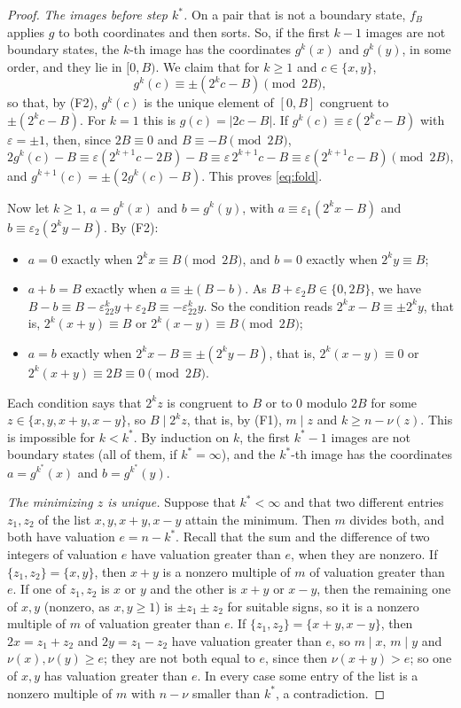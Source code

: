 \documentclass[11pt]{amsart}
\theoremstyle{definition}
\theoremstyle{remark}
\newcommand{\vt}{\nu}
\begin{document}
\begin{proof}
\emph{The images before step $k^*$.} On a pair that is not a boundary state, $f_B$ applies $g$ to both coordinates and then sorts. So, if the first $k-1$ images are not boundary states, the $k$-th image has the coordinates $g^k(x)$ and $g^k(y)$, in some order, and they lie in $[0,B)$. We claim that for $k\ge1$ and $c\in\{x,y\}$,
\begin{equation}\label{eq:fold}
g^k(c)\equiv\pm(2^kc-B)\pmod{2B},
\end{equation}
so that, by (F2), $g^k(c)$ is the unique element of $[0,B]$ congruent to $\pm(2^kc-B)$. For $k=1$ this is $g(c)=|2c-B|$. If $g^k(c)\equiv\varepsilon(2^kc-B)$ with $\varepsilon=\pm1$, then, since $2B\equiv0$ and $B\equiv-B\pmod{2B}$,
\[
2g^k(c)-B\equiv\varepsilon(2^{k+1}c-2B)-B\equiv\varepsilon\,2^{k+1}c-B\equiv\varepsilon(2^{k+1}c-B)\pmod{2B},
\]
and $g^{k+1}(c)=\pm(2g^k(c)-B)$. This proves \eqref{eq:fold}.

Now let $k\ge1$, $a=g^k(x)$ and $b=g^k(y)$, with $a\equiv\varepsilon_1(2^kx-B)$ and $b\equiv\varepsilon_2(2^ky-B)$. By (F2):
\begin{itemize}
\item $a=0$ exactly when $2^kx\equiv B\pmod{2B}$, and $b=0$ exactly when $2^ky\equiv B$;
\item $a+b=B$ exactly when $a\equiv\pm(B-b)$. As $B+\varepsilon_2B\in\{0,2B\}$, we have $B-b\equiv B-\varepsilon_22^ky+\varepsilon_2B\equiv-\varepsilon_22^ky$. So the condition reads $2^kx-B\equiv\pm2^ky$, that is, $2^k(x+y)\equiv B$ or $2^k(x-y)\equiv B\pmod{2B}$;
\item $a=b$ exactly when $2^kx-B\equiv\pm(2^ky-B)$, that is, $2^k(x-y)\equiv0$ or $2^k(x+y)\equiv2B\equiv0\pmod{2B}$.
\end{itemize}
Each condition says that $2^kz$ is congruent to $B$ or to $0$ modulo $2B$ for some $z\in\{x,y,x+y,x-y\}$, so $B\mid2^kz$, that is, by (F1), $m\mid z$ and $k\ge n-\vt(z)$. This is impossible for $k<k^*$. By induction on $k$, the first $k^*-1$ images are not boundary states (all of them, if $k^*=\infty$), and the $k^*$-th image has the coordinates $a=g^{k^*}(x)$ and $b=g^{k^*}(y)$.

\emph{The minimizing $z$ is unique.} Suppose that $k^*<\infty$ and that two different entries $z_1,z_2$ of the list $x,y,x+y,x-y$ attain the minimum. Then $m$ divides both, and both have valuation $e=n-k^*$. Recall that the sum and the difference of two integers of valuation $e$ have valuation greater than $e$, when they are nonzero. If $\{z_1,z_2\}=\{x,y\}$, then $x+y$ is a nonzero multiple of $m$ of valuation greater than $e$. If one of $z_1,z_2$ is $x$ or $y$ and the other is $x+y$ or $x-y$, then the remaining one of $x,y$ (nonzero, as $x,y\ge1$) is $\pm z_1\pm z_2$ for suitable signs, so it is a nonzero multiple of $m$ of valuation greater than $e$. If $\{z_1,z_2\}=\{x+y,x-y\}$, then $2x=z_1+z_2$ and $2y=z_1-z_2$ have valuation greater than $e$, so $m\mid x$, $m\mid y$ and $\vt(x),\vt(y)\ge e$; they are not both equal to $e$, since then $\vt(x+y)>e$; so one of $x,y$ has valuation greater than $e$. In every case some entry of the list is a nonzero multiple of $m$ with $n-\vt$ smaller than $k^*$, a contradiction.


\end{proof}
\end{document}
